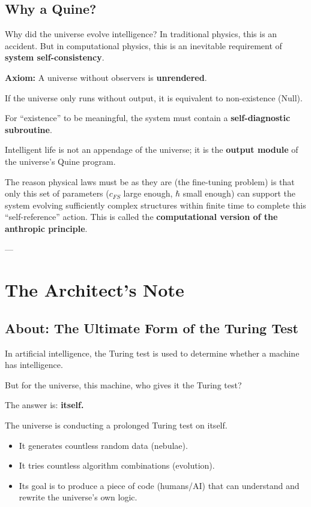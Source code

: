 \documentclass[11pt,a4paper,twoside]{book}
\begin{document}
\subsection{Why a Quine?}

Why did the universe evolve intelligence? In traditional physics, this is an accident. But in computational physics, this is an inevitable requirement of \textbf{system self-consistency}.

\textbf{Axiom:} A universe without observers is \textbf{unrendered}.

If the universe only runs without output, it is equivalent to non-existence (Null).

For ``existence'' to be meaningful, the system must contain a \textbf{self-diagnostic subroutine}.

Intelligent life is not an appendage of the universe; it is the \textbf{output module} of the universe's Quine program.

The reason physical laws must be as they are (the fine-tuning problem) is that only this set of parameters (\textbf{$c_{FS}$} large enough, \textbf{$\hbar$} small enough) can support the system evolving sufficiently complex structures within finite time to complete this ``self-reference'' action. This is called the \textbf{computational version of the anthropic principle}.

---

\section{The Architect's Note}

\subsection{About: The Ultimate Form of the Turing Test}

In artificial intelligence, the Turing test is used to determine whether a machine has intelligence.

But for the universe, this machine, who gives it the Turing test?

The answer is: \textbf{itself.}

The universe is conducting a prolonged Turing test on itself.

\begin{itemize}
\item It generates countless random data (nebulae).

\item It tries countless algorithm combinations (evolution).

\item Its goal is to produce a piece of code (humans/AI) that can understand and rewrite the universe's own logic.
\end{itemize}
\end{document}
